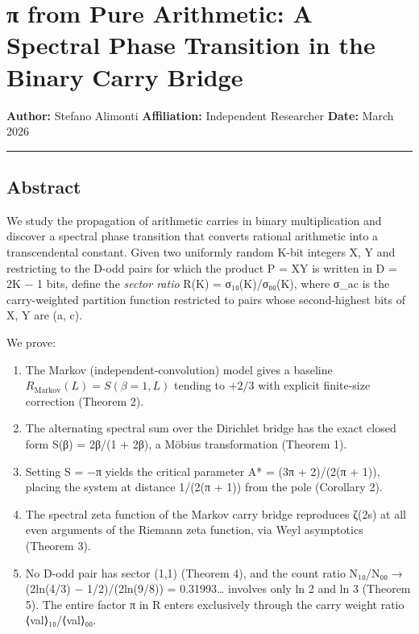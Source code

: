 \documentclass[
  11pt,
]{article}
\author{Stefano Alimonti --- stefalimonti@gmail.com}
\date{March 2026}
\providecommand{\tightlist}{%
  \setlength{\itemsep}{0pt}\setlength{\parskip}{0pt}}
\begin{document}
{
\hypersetup{linkcolor=black}
\setcounter{tocdepth}{2}
\tableofcontents
}
\section{π from Pure Arithmetic: A Spectral Phase Transition in the Binary Carry
Bridge}\label{ux3c0-from-pure-arithmetic-a-spectral-phase-transition-in-the-binary-carry-bridge}

\textbf{Author:} Stefano Alimonti \textbf{Affiliation:} Independent Researcher
\textbf{Date:} March 2026

\begin{center}\rule{0.5\linewidth}{0.5pt}\end{center}

\newpage

\subsection{Abstract}\label{abstract}

We study the propagation of arithmetic carries in binary multiplication and
discover a spectral phase transition that converts rational arithmetic into a
transcendental constant. Given two uniformly random K-bit integers X, Y and
restricting to the D-odd pairs for which the product P = XY is written in D = 2K
− 1 bits, define the \emph{sector ratio} R(K) = σ₁₀(K)/σ₀₀(K), where σ\_ac is
the carry-weighted partition function restricted to pairs whose second-highest
bits of X, Y are (a, c).

We prove:

\begin{enumerate}
\def\labelenumi{\arabic{enumi}.}
\tightlist
\item
  The Markov (independent-convolution) model gives a baseline
  \(R_{\mathrm{Markov}}(L) = S(\beta = 1, L)\) tending to \(+2/3\) with explicit
  finite-size correction (Theorem 2).
\item
  The alternating spectral sum over the Dirichlet bridge has the exact closed
  form S(β) = 2β/(1 + 2β), a Möbius transformation (Theorem 1).
\item
  Setting S = −π yields the critical parameter A* = (3π + 2)/(2(π + 1)), placing
  the system at distance 1/(2(π + 1)) from the pole (Corollary 2).
\item
  The spectral zeta function of the Markov carry bridge reproduces ζ(2s) at all
  even arguments of the Riemann zeta function, via Weyl asymptotics (Theorem 3).
\item
  No D-odd pair has sector (1,1) (Theorem 4), and the count ratio N₁₀/N₀₀ →
  (2ln(4/3) − 1/2)/(2ln(9/8)) = 0.31993\ldots{} involves only ln 2 and ln 3
  (Theorem 5). The entire factor π in R enters exclusively through the carry
  weight ratio ⟨val⟩₁₀/⟨val⟩₀₀.
\end{enumerate}
\end{document}
